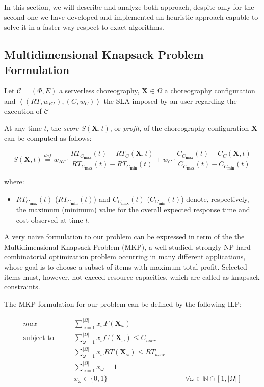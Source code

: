 \documentclass[12pt,a4paper]{report}
\newcommand{\mathDef}{\overset{\textit{def}}{=}}
\newcommand{\N}{\mathbb{N}}
\begin{document}
In this section, we will describe and analyze both approach, despite only for the second one we have developed and implemented an heuristic approach capable to solve it in a faster way respect to exact algorithms. 

\subsection{Multidimensional Knapsack Problem Formulation}

Let $\mathcal{C} = (\Phi,E)$ a serverless choreography, $\textbf{X} \in \Omega$ a choreography configuration and $\left\langle (RT,w_{RT}),(C,w_{C}) \right\rangle$ the SLA imposed by an user regarding the execution of $\mathcal{C}$

At any time $t$, the \textit{score} $S(\textbf{X},t)$, or \textit{profit}, of the choreography configuration $\textbf{X}$ can be computed as follows:

\begin{equation}
	S(\textbf{X},t) \mathDef w_{RT} \cdot \dfrac{RT_{C_{\textbf{max}}}(t) - RT_C(\textbf{X},t)}{RT_{C_{\textbf{max}}}(t) - RT_{C_{\textbf{min}}}(t)} + w_{C} \cdot \dfrac{C_{C_{\textbf{max}}}(t) - C_C(\textbf{X},t)}{C_{C_{\textbf{max}}}(t) - C_{C_{\textbf{min}}}(t)}
\end{equation}

where:

\begin{itemize}
	\item $RT_{C_{\textbf{max}}}(t)$ ($RT_{C_{\textbf{min}}}(t)$) and $C_{C_{\textbf{max}}}(t)$ ($C_{C_{\textbf{min}}}(t)$) denote, respectively, the maximum (minimum) value for the overall expected response time and cost observed at time $t$.
\end{itemize}

A very naive formulation to our problem can be expressed in term of the the Multidimensional Knapsack Problem (MKP), a well-studied, strongly NP-hard combinatorial optimization problem occurring in many different applications, whose goal is to choose a subset of items with maximum total profit. Selected items must, however, not exceed resource capacities, which are called as knapsack constraints.

The MKP formulation for our problem can be defined by the following ILP:

\begin{align}
\displaystyle max \qquad & \displaystyle \sum_{\omega = 1}^{|\Omega|} x_{\omega} F(\textbf{X}_{\omega}) \\
\text{subject to} \qquad & \displaystyle \sum_{\omega = 1}^{|\Omega|} x_{\omega} C(\textbf{X}_{\omega}) \leq C_{user} \\
& \displaystyle \sum_{\omega = 1}^{|\Omega|} x_{\omega} RT(\textbf{X}_{\omega}) \leq RT_{user} \\ 
& \displaystyle \sum_{\omega = 1}^{|\Omega|} x_{\omega} = 1 & \\
& x_{\omega} \in \lbrace 0, 1 \rbrace & \qquad \forall \omega \in \N \cap [1,|\Omega|]
\end{align}
\end{document}
